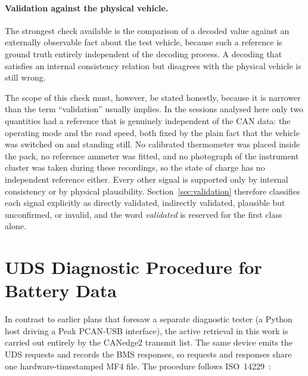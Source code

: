 \documentclass[11pt,a4paper,oneside,parskip=half]{scrreprt}
\begin{document}
\paragraph{Validation against the physical vehicle.} The strongest check available is the comparison of a decoded value against an externally observable fact about the test vehicle, because such a reference is ground truth entirely independent of the decoding process. A decoding that satisfies an internal consistency relation but disagrees with the physical vehicle is still wrong.

The scope of this check must, however, be stated honestly, because it is narrower than the term ``validation'' usually implies. In the sessions analysed here only two quantities had a reference that is genuinely independent of the CAN data: the operating mode and the road speed, both fixed by the plain fact that the vehicle was switched on and standing still. No calibrated thermometer was placed inside the pack, no reference ammeter was fitted, and no photograph of the instrument cluster was taken during these recordings, so the state of charge has no independent reference either. Every other signal is supported only by internal consistency or by physical plausibility. Section~\ref{sec:validation} therefore classifies each signal explicitly as directly validated, indirectly validated, plausible but unconfirmed, or invalid, and the word \emph{validated} is reserved for the first class alone.

\section{UDS Diagnostic Procedure for Battery Data}
\label{sec:uds_procedure}
In contrast to earlier plans that foresaw a separate diagnostic tester (a Python host driving a Peak PCAN-USB interface), the active retrieval in this work is carried out entirely by the CANedge2 transmit list. The same device emits the UDS requests and records the BMS responses, so requests and responses share one hardware-timestamped MF4 file. The procedure follows ISO~14229~\cite{iso14229}:
\end{document}
